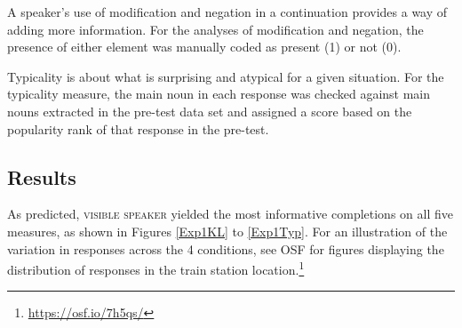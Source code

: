 \documentclass[output=paper,colorlinks,citecolor=brown]{langscibook}
\begin{document}
A speaker’s use of modification and negation in a continuation provides a way of adding more information. For the analyses of modification and negation, the presence of either element was manually coded as present (1) or not (0).
 
Typicality is about what is surprising and atypical for a given situation. For the typicality measure, the main noun in each response was checked against main nouns extracted in the pre-test data set and assigned a score based on the popularity rank of that response in the pre-test.

\subsection{Results}

As predicted, \textsc{visible speaker} yielded the most informative completions on all five measures, as shown in Figures \ref{Exp1KL} to \ref{Exp1Typ}. For an illustration of the variation in responses across the 4 conditions, see OSF for figures displaying the distribution of responses in the train station location.\footnote{\url{https://osf.io/7h5qs/}} 
\end{document}
